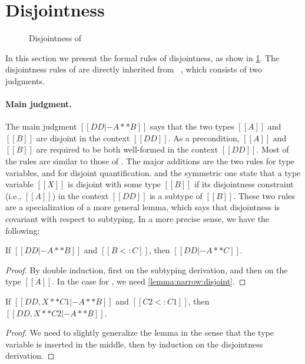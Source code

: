 
\section{Disjointness}
\label{sec:disjoint:fi}


\begin{figure}[t]
  \centering
  \caption{Disjointness of \fnamee}
  \label{fig:disjoint:fi}
\end{figure}


In this section we present the formal rules of disjointness, as show in
\cref{fig:disjoint:fi}. The disjointness rules of \fnamee are directly inherited
from \fname~\citep{alpuimdisjoint}, which consists of two judgments.


\paragraph{Main judgment.}

The main judgment $[[DD |- A ** B]]$ says that the two types $[[A]]$ and $[[B]]$
are disjoint in the context $[[DD]]$. As a precondition, $[[A]]$
and $[[B]]$ are required to be both well-formed in the context $[[DD]]$.
Most of the rules are similar to those of
\namee. The major additions are the two rules  for
type variables, and  for disjoint quantification.
 and the symmetric one  state that a type
variable $[[X]]$ is disjoint with some type $[[B]]$ if its
disjointness constraint (i.e., $[[A]]$) in the context $[[DD]]$ is a subtype of
$[[B]]$. These two rules are a specialization of a more general lemma, which
says that disjointness is covariant with respect to subtyping. In a more precise
sense, we have the following:

\begin{lemma} \label{lemma:covariance:disjoint}
  If $[[DD |- A ** B]]$ and $[[B <: C]]$, then $[[DD |- A ** C]]$.
\end{lemma}
\begin{proof}
  By double induction, first on the subtyping derivation, and then on the
  type $[[A]]$. In the case for , we need \cref{lemma:narrow:disjoint}.
\end{proof}

\begin{lemma} \label{lemma:narrow:disjoint}
  If $[[DD, X ** C1 |- A ** B]]$ and $[[C2 <: C1]]$, then $[[DD, X ** C2 |- A ** B]]$.
\end{lemma}
\begin{proof}
  We need to slightly generalize the lemma in the sense that the type variable is inserted
  in the middle, then by induction on the disjointness derivation.
\end{proof}

